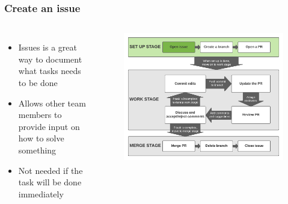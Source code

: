 \documentclass[aspectratio=169]{beamer} %
\begin{document}
\begin{frame}
	\frametitle{Create an issue}
	\begin{columns}[c]
		
		\begin{itemize}
			\setlength\itemsep{1em}
			\item Issues is a great way to document what tasks needs to be done
			\item Allows other team members to provide input on how to solve something
			\item Not needed if the task will be done immediately
		\end{itemize}
		
		\vspace{-.75cm}
		\begin{figure}
			\centering
			\includegraphics[width=\textwidth]{./img/branch-pr-merge-cycle-S1-1.png}
		\end{figure}
		
	\end{columns}
\end{frame}
\end{document}
